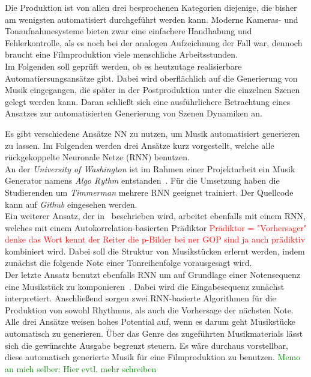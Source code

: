 \documentclass[times, 11pt,twocolumn]{article}
\begin{document}
 \label{sec:Produktion}
Die Produktion ist von allen drei besprochenen Kategorien diejenige, die bisher am wenigsten automatisiert durchgeführt werden kann. Moderne Kameras- und Tonaufnahmesysteme bieten zwar eine einfachere Handhabung und Fehlerkontrolle, als es noch bei der analogen Aufzeichnung der Fall war, dennoch braucht eine Filmproduktion viele menschliche Arbeitsstunden. \\
Im Folgenden soll geprüft werden, ob es heutzutage realisierbare Automatiersungsansätze gibt. Dabei wird oberflächlich auf die Generierung von Musik eingegangen, die später in der Postproduktion unter die einzelnen Szenen gelegt werden kann. Daran schließt sich eine ausführlichere Betrachtung eines Ansatzes zur automatisierten Generierung von Szenen Dynamiken an. 


 \label{sec:SOTAProduktion}
Es gibt verschiedene Ansätze NN zu nutzen, um Musik automatisiert generieren zu lassen. Im Folgenden werden drei Ansätze kurz vorgestellt, welche alle rückgekoppelte Neuronale Netze (RNN) benutzen. \\
An der \textit{University of Washington} ist im Rahmen einer Projektarbeit ein Musik Generator namens \textit{Algo Rythm} entstanden~\cite{Algorithm}. Für die Umsetzung haben die Studierenden um \textit{Timmerman} mehrere RNN geeignet trainiert. Der Quellcode kann auf \textit{Github} \cite{AlgorithmGit} eingesehen werden.\\
Ein weiterer Ansatz, der in~\cite{eck+lapalme:2008} beschrieben wird, arbeitet ebenfalls mit einem RNN, welches mit einem Autokorrelation-basierten Prädiktor \textcolor{red}{Prädiktor = "Vorhersager" denke das Wort kennt der Reiter die p-Bilder bei ner GOP sind ja auch prädiktiv} kombiniert wird. Dabei soll die Struktur von Musikstücken erlernt werden, indem zunächst die folgende Note einer Tonreihenfolge vorausgesagt wird. \\
Der letzte Ansatz benutzt ebenfalls RNN um auf Grundlage einer Notensequenz eine Musikstück zu komponieren~\cite{browne2001system}. Dabei wird die Eingabesequenz zunächst interpretiert. Anschließend sorgen zwei RNN-basierte Algorithmen für die Produktion von sowohl Rhythmus, als auch die Vorhersage der nächsten Note. \\

Alle drei Ansätze weisen hohes Potential auf, wenn es darum geht Musikstücke automatisch zu generieren. Über das Genre des zugeführten Musikmaterials lässt sich die gewünschte Ausgabe begrenzt steuern. Es wäre durchaus vorstellbar, diese automatisch generierte Musik für eine Filmproduktion zu benutzen.
\textcolor{green}{Memo an mich selber: Hier evtl. mehr schreiben}
\end{document}
